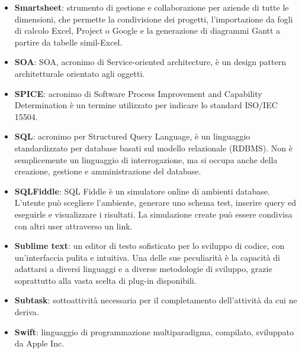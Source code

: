 \begin{itemize}
	\item \textbf{Smartsheet}: strumento di gestione e collaborazione per aziende di tutte le dimensioni, che permette la condivisione dei progetti, l'importazione da fogli di calcolo Excel, Project o Google e la generazione di diagrammi Gantt a partire da tabelle simil-Excel.
	\item \textbf{SOA}: SOA, acronimo di Service-oriented architecture, è un design pattern architetturale orientato agli oggetti.
	\item \textbf{SPICE}: acronimo di Software Process Improvement and Capability Determination è un termine utilizzato per indicare lo standard ISO/IEC 15504.
	\item \textbf{SQL}: acronimo per Structured Query Language, è un linguaggio standardizzato per database basati sul modello relazionale (RDBMS). Non è semplicemente un linguaggio di interrogazione, ma si occupa anche della creazione, gestione e amministrazione del database.
	\item \textbf{SQLFiddle}: SQL Fiddle è un simulatore online di ambienti database. L'utente può scegliere l'ambiente, generare uno schema test, inserire query ed eseguirle e visualizzare i risultati. La simulazione create può essere condivisa con altri user attraverso un link.
	\item \textbf{Sublime text}: un editor di testo sofisticato per lo sviluppo di codice, con un'interfaccia pulita e intuitiva. Una delle sue peculiarit\`{a} \`{e} la capacità di adattarsi a diversi linguaggi e a diverse metodologie di sviluppo, grazie soprattutto alla vasta scelta di plug-in disponibili.
	\item \textbf{Subtask}: sottoattività necessaria per il completamento dell'attività da cui ne deriva.
	\item \textbf{Swift}: linguaggio di programmazione multiparadigma, compilato, sviluppato da Apple Inc.
\end{itemize}
